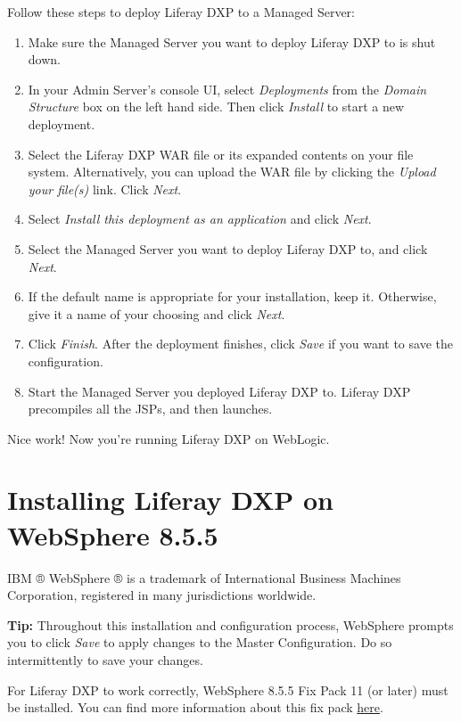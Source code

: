 Follow these steps to deploy Liferay DXP to a Managed Server:

\begin{enumerate}
\def\labelenumi{\arabic{enumi}.}
\item
  Make sure the Managed Server you want to deploy Liferay DXP to is shut
  down.
\item
  In your Admin Server's console UI, select \emph{Deployments} from the
  \emph{Domain Structure} box on the left hand side. Then click
  \emph{Install} to start a new deployment.
\item
  Select the Liferay DXP WAR file or its expanded contents on your file
  system. Alternatively, you can upload the WAR file by clicking the
  \emph{Upload your file(s)} link. Click \emph{Next}.
\item
  Select \emph{Install this deployment as an application} and click
  \emph{Next}.
\item
  Select the Managed Server you want to deploy Liferay DXP to, and click
  \emph{Next}.
\item
  If the default name is appropriate for your installation, keep it.
  Otherwise, give it a name of your choosing and click \emph{Next}.
\item
  Click \emph{Finish}. After the deployment finishes, click \emph{Save}
  if you want to save the configuration.
\item
  Start the Managed Server you deployed Liferay DXP to. Liferay DXP
  precompiles all the JSPs, and then launches.
\end{enumerate}

Nice work! Now you're running Liferay DXP on WebLogic.

\section{Installing Liferay DXP on WebSphere
8.5.5}\label{installing-liferay-dxp-on-websphere-8.5.5}

IBM ® WebSphere ® is a trademark of International Business Machines
Corporation, registered in many jurisdictions worldwide.

\noindent\hrulefill

\textbf{Tip:} Throughout this installation and configuration process,
WebSphere prompts you to click \emph{Save} to apply changes to the
Master Configuration. Do so intermittently to save your changes.

\noindent\hrulefill

For Liferay DXP to work correctly, WebSphere 8.5.5 Fix Pack 11 (or
later) must be installed. You can find more information about this fix
pack
\href{http://www-01.ibm.com/support/docview.wss?uid=swg24043005}{here}.

